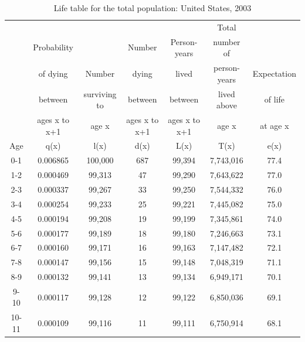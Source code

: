 \documentclass[10pt,a4paper]{article}
\begin{document}
\begin{longtable}{|c|c|c|c|c|c|c|}
\caption{Life table for the total population: United States, 2003 \citep{Arias2007}}
    \label{LifeTable}\\
 \hline 
      &               &              &               &               & Total        &              \\
       & Probability   &              & Number        & Person-years  & number of    &              \\
       & of dying      & Number       & dying         & lived         & person-years & Expectation  \\
       & between       & surviving to & between       & between       & lived above  & of life      \\
       & ages x to x+1 & age x        & ages x to x+1 & ages x to x+1 & age x        & at age x     \\
\hline  
Age    & q(x)          & l(x)         & d(x)          & L(x)          & T(x)         & e(x)         \\
\hline 
0-1    & 0.006865      & 100,000      & 687           & 99,394        & 7,743,016    & 77.4         \\
1-2    & 0.000469      & 99,313       & 47            & 99,290        & 7,643,622    & 77.0         \\
2-3    & 0.000337      & 99,267       & 33            & 99,250        & 7,544,332    & 76.0         \\
3-4    & 0.000254      & 99,233       & 25            & 99,221        & 7,445,082    & 75.0         \\
4-5    & 0.000194      & 99,208       & 19            & 99,199        & 7,345,861    & 74.0         \\
5-6    & 0.000177      & 99,189       & 18            & 99,180        & 7,246,663    & 73.1         \\
6-7    & 0.000160      & 99,171       & 16            & 99,163        & 7,147,482    & 72.1         \\
7-8    & 0.000147      & 99,156       & 15            & 99,148        & 7,048,319    & 71.1         \\
8-9    & 0.000132      & 99,141       & 13            & 99,134        & 6,949,171    & 70.1         \\
9-10   & 0.000117      & 99,128       & 12            & 99,122        & 6,850,036    & 69.1         \\
10-11  & 0.000109      & 99,116       & 11            & 99,111        & 6,750,914    & 68.1         \\

\end{longtable}
\end{document}
